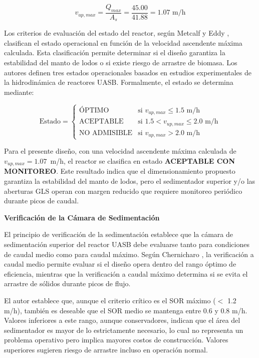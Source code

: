 \documentclass[12pt,a4paper]{article}
\newcommand{\captionequation}[1]{}  %
\begin{document}
\begin{equation}
v_{up,max} = \frac{Q_{max}}{A_s} = \frac{45.00}{41.88} = 1.07 \text{ m/h}
\end{equation}

Los criterios de evaluación del estado del reactor, según Metcalf y Eddy \cite{metcalf2014}, clasifican el estado operacional en función de la velocidad ascendente máxima calculada. Esta clasificación permite determinar si el diseño garantiza la estabilidad del manto de lodos o si existe riesgo de arrastre de biomasa. Los autores definen tres estados operacionales basados en estudios experimentales de la hidrodinámica de reactores UASB. Formalmente, el estado se determina mediante:

\begin{equation}
\text{Estado} = \begin{cases}
    \text{ÓPTIMO} & \text{si } v_{up,max} \leq 1.5 \text{ m/h} \\
    \text{ACEPTABLE} & \text{si } 1.5 < v_{up,max} \leq 2.0 \text{ m/h} \\
    \text{NO ADMISIBLE} & \text{si } v_{up,max} > 2.0 \text{ m/h}
\end{cases}
\end{equation}
\captionequation{Criterios de verificación de arrastre del manto según Metcalf y Eddy (2014)}

Para el presente diseño, con una velocidad ascendente máxima calculada de $v_{up,max} = 1.07$~m/h, el reactor se clasifica en estado \textbf{ACEPTABLE CON MONITOREO}. Este resultado indica que el dimensionamiento propuesto garantiza la estabilidad del manto de lodos, pero el sedimentador superior y/o las aberturas GLS operan con margen reducido que requiere monitoreo periódico durante picos de caudal.

\textbf{Verificación de la Cámara de Sedimentación}

El principio de verificación de la sedimentación establece que la cámara de sedimentación superior del reactor UASB debe evaluarse tanto para condiciones de caudal medio como para caudal máximo. Según Chernicharo \cite{chernicharo2007}, la verificación a caudal medio permite evaluar si el diseño opera dentro del rango óptimo de eficiencia, mientras que la verificación a caudal máximo determina si se evita el arrastre de sólidos durante picos de flujo.

El autor establece que, aunque el criterio crítico es el SOR máximo ($<$ 1.2 m/h), también es deseable que el SOR medio se mantenga entre 0.6 y 0.8 m/h. Valores inferiores a este rango, aunque conservadores, indican que el área del sedimentador es mayor de lo estrictamente necesario, lo cual no representa un problema operativo pero implica mayores costos de construcción. Valores superiores sugieren riesgo de arrastre incluso en operación normal.
\end{document}
